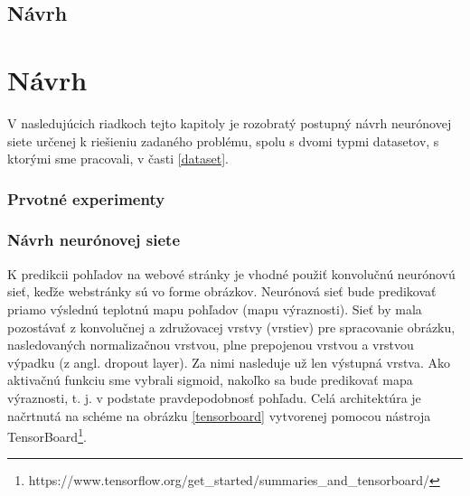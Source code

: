 \newpage
{}
{
	\section{Návrh}
}
{
	\chapter{Návrh}
}

V nasledujúcich riadkoch tejto kapitoly je rozobratý postupný návrh neurónovej siete určenej k riešieniu zadaného problému, spolu s dvomi typmi datasetov, s ktorými sme pracovali, v časti \ref{dataset}.

\subsection{Prvotné experimenty}

\subsection{Návrh neurónovej siete}
\label{navrh}
K predikcii pohľadov na webové stránky je vhodné použiť konvolučnú neurónovú sieť, keďže webstránky sú vo forme obrázkov. Neurónová sieť bude predikovať priamo výslednú teplotnú mapu pohľadov (mapu výraznosti). Sieť by mala pozostávať z konvolučnej a združovacej vrstvy (vrstiev) pre spracovanie obrázku, nasledovaných normalizačnou vrstvou, plne prepojenou vrstvou a vrstvou výpadku (z angl. dropout layer). Za nimi nasleduje už len výstupná vrstva. Ako aktivačnú funkciu sme vybrali sigmoid, nakoľko sa bude predikovať mapa výraznosti, t. j. v podstate pravdepodobnosť pohľadu. Celá architektúra je načrtnutá na schéme na obrázku \ref{tensorboard} vytvorenej pomocou nástroja  TensorBoard\footnote{https://www.tensorflow.org/get\_started/summaries\_and\_tensorboard/}.
\newline
\newline
\newline
\newline
\newline
\newline
\newline
\newline
\newline
\newline
\newline
\newline
\newline
\newline



